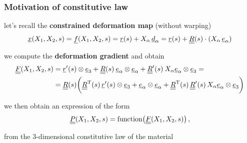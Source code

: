 \begin{frame}
  \frametitle{Motivation of constitutive law}

  let's recall the \textbf{constrained deformation map} (without warping)
  \begin{displaymath}
    \underline{x}(X_1,X_2,s) = \underline{f}(X_1,X_2,s) = \underline{r}(s) + X_{\alpha} \, \underline{d}_{\alpha} = \underline{r}(s) + \underline{\underline{R}}(s) \cdot ( X_{\alpha} \, \underline{e}_{\alpha} )
  \end{displaymath}
  
  we compute the \textbf{deformation gradient} and obtain
  \begin{displaymath}
    \begin{alignedat}{1}
      \underline{\underline{F}}(X_1,X_2,s) &= \underline{r}^{\prime}(s) \otimes \underline{e}_3 + \underline{\underline{R}}(s) \: \underline{e}_{\alpha} \otimes \underline{e}_{\alpha} + \underline{\underline{R}}^{\prime}(s) \: X_{\alpha} \underline{e}_{\alpha} \otimes \underline{e}_3 = \\
      &= \underline{\underline{R}}(s) \biggl( \underline{\underline{R}}^{\mathrm{T}}(s) \, \underline{r}^{\prime}(s) \otimes \underline{e}_3 + \underline{e}_{\alpha} \otimes \underline{e}_{\alpha} + \underline{\underline{R}}^{\mathrm{T}}(s) \, \underline{\underline{R}}^{\prime}(s) \, X_{\alpha} \underline{e}_{\alpha} \otimes \underline{e}_3 \biggr)
    \end{alignedat}
  \end{displaymath}
  
  \vspace{1em}
  we then obtain an expression of the form
  \begin{displaymath}
    \underline{\underline{P}}(X_1,X_2,s) = \mathop{\mathrm{function}}\bigl( \underline{\underline{F}}(X_1,X_2,s) \bigr) \, ,
  \end{displaymath}
  
  \vspace{0.4em}
  from the 3-dimensional constitutive law of the material
\end{frame}



